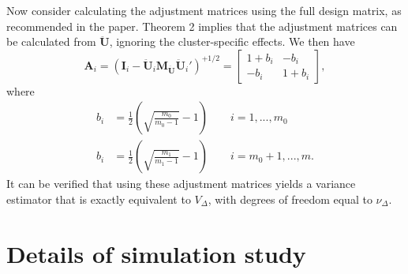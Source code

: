 \documentclass{article}\usepackage[]{graphicx}\usepackage[]{color}
\newcommand{\bm}{\mathbf}
\begin{document}
Now consider calculating the adjustment matrices using the full design matrix, as recommended in the paper. Theorem 2 implies that the adjustment matrices can be calculated from $\bm{\ddot{U}}$, ignoring the cluster-specific effects. We then have
\[
\bm{A}_i = \left(\bm{I}_i - \bm{\ddot{U}}_i \bm{M_{\ddot{U}}} \bm{\ddot{U}}_i'\right)^{+1/2} = \left[\begin{array}{cc} 1 + b_i & - b_i \\ -b_i & 1 + b_i \end{array}\right],
\]
where
\begin{align*}
b_i &= \frac{1}{2}\left(\sqrt{\frac{m_0}{m_0 - 1}} - 1\right) \qquad i = 1,...,m_0 \\
b_i &= \frac{1}{2}\left(\sqrt{\frac{m_1}{m_1 - 1}} - 1\right) \qquad i = m_0 + 1,...,m.
\end{align*}
It can be verified that using these adjustment matrices yields a variance estimator that is exactly equivalent to $V_{\Delta}$, with degrees of freedom equal to $\nu_\Delta$.

\newpage

\section{Details of simulation study}
\label{sec:simulations}
\end{document}
